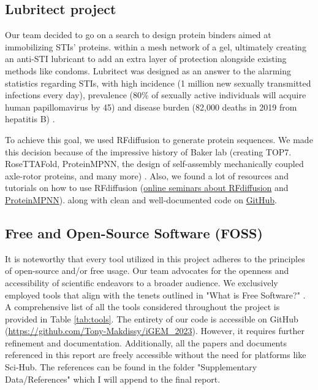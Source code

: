 \documentclass[11pt,a4paper]{article}
\begin{document}
\subsection{Lubritect project}

Our team decided to go on a search to design protein binders aimed at immobilizing STIs' proteins.
within a mesh network of a gel, ultimately creating an anti-STI lubricant to add an extra layer of protection alongside 
existing methods like condoms. 
Lubritect was designed
as an answer to the alarming statistics regarding STIs, with high incidence 
(1 million new sexually transmitted infections every day), 
prevalence (80\% of sexually active individuals will acquire human papillomavirus by 45)
and disease burden (82,000 deaths in 2019 from hepatitis B) \cite{paris_bettencourt_project}.

To achieve this goal, we used RFdiffusion to generate protein 
sequences. We made this decision because of the impressive history of
Baker lab (creating TOP7. RoseTTAFold, ProteinMPNN, the design
of self-assembly mechanically coupled axle-rotor proteins, and many more) \cite{bakerlab}.
Also, we found a lot of resources and tutorials on how to use RFdiffusion 
(\href{https://www.youtube.com/watch?v=wIHwHDt2NoI}{online seminars about RFdiffusion} and 
\href{https://youtu.be/aVQQuoToTJA?si=PnQvJluY3ZPHo4TO}{ProteinMPNN}).
along with clean and well-documented code on \href{https://github.com/RosettaCommons/RFdiffusion}{GitHub}.

\subsection{Free and Open-Source Software (FOSS)}

It is noteworthy that every tool utilized in this project adheres to the principles of open-source and/or free usage. Our team advocates for the openness and accessibility of scientific endeavors to a broader audience. We exclusively employed tools that align with the tenets outlined in "What is Free Software?" \cite{gun_foss}. A comprehensive list of all the tools considered throughout the project is provided in Table \ref{tab:tools}.
The entirety of our code is accessible on GitHub (\url{https://github.com/Tony-Makdissy/iGEM_2023}). However, it requires further refinement and documentation.
Additionally, all the papers and documents referenced in this report are freely accessible without the need for platforms like Sci-Hub. The references can be found in the folder "Supplementary Data/References" which I will append to the final report.
\end{document}
